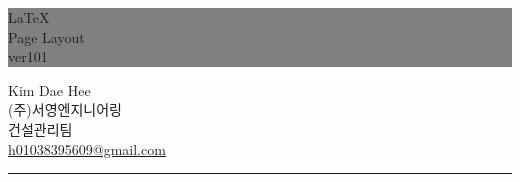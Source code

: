 \documentclass[12pt,a4paper]{book}
\begin{document}
		\dominitoc
		

			\begin{titlepage}
			\thispagestyle{empty}				%
			\colorbox	{grey}
						{ \parbox[t]{1.0\linewidth}
						{
						\vspace*{1.2cm} 
						\fontsize{20}{20} \rmfamily \hfill \LaTeX 		\\ [0.8cm] \null
						\fontsize{40}{20} \rmfamily \hfill Page Layout \\ [0.8cm] \null
						\fontsize{20}{50} \rmfamily \hfill ver101
						\vspace*{0.8cm} 
						} }
			\vfill
			\hfill Kim Dae Hee\\ \null
			\hfill (주)서영엔지니어링\\ \null
			\hfill 건설관리팀\\ \null
			\hfill \url{h01038395609@gmail.com} \\ \null
			\hfill \rule{0.4\linewidth}{1pt}
			\end{titlepage}
			\cleardoublepage
% 


			\newpage
			\tableofcontents
			
			\newpage
			\listoffigures
			\listoftables
			

\end{document}
